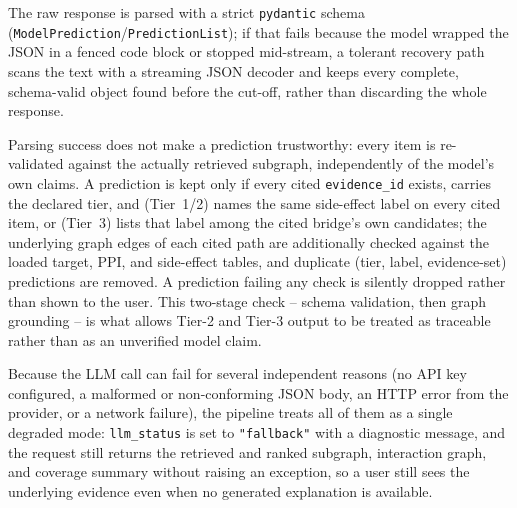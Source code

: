 \documentclass[11pt]{report}
\begin{document}
The raw response is parsed with a strict \texttt{pydantic} schema
(\texttt{ModelPrediction}/\texttt{PredictionList}); if that fails because
the model wrapped the JSON in a fenced code block or stopped mid-stream, a
tolerant recovery path scans the text with a streaming JSON decoder and
keeps every complete, schema-valid object found before the cut-off, rather
than discarding the whole response.

Parsing success does not make a prediction trustworthy: every item is
re-validated against the actually retrieved subgraph, independently of the
model's own claims. A prediction is kept only if every cited
\texttt{evidence\_id} exists, carries the declared tier, and (Tier~1/2)
names the same side-effect label on every cited item, or (Tier~3) lists
that label among the cited bridge's own candidates; the underlying graph
edges of each cited path are additionally checked against the loaded
target, PPI, and side-effect tables, and duplicate
(tier, label, evidence-set) predictions are removed. A prediction failing
any check is silently dropped rather than shown to the user. This two-stage
check -- schema validation, then graph grounding -- is what allows Tier-2
and Tier-3 output to be treated as traceable rather than as an unverified
model claim.

Because the LLM call can fail for several independent reasons (no API key
configured, a malformed or non-conforming JSON body, an HTTP error from the
provider, or a network failure), the pipeline treats all of them as a
single degraded mode: \texttt{llm\_status} is set to \texttt{"fallback"}
with a diagnostic message, and the request still returns the retrieved and
ranked subgraph, interaction graph, and coverage summary without raising an
exception, so a user still sees the underlying evidence even when no
generated explanation is available.
\end{document}
